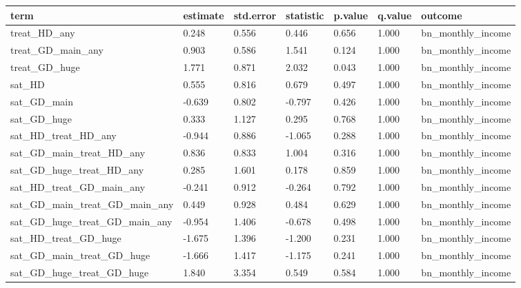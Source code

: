 \begin{tabular}{lllllll}
\toprule
term & estimate & std.error & statistic & p.value & q.value & outcome
 \\
\midrule
treat\_HD\_any & 0.248 & 0.556 & 0.446 & 0.656 & 1.000 & bn\_monthly\_income \\
treat\_GD\_main\_any & 0.903 & 0.586 & 1.541 & 0.124 & 1.000 & bn\_monthly\_income \\
treat\_GD\_huge & 1.771 & 0.871 & 2.032 & 0.043 & 1.000 & bn\_monthly\_income \\
sat\_HD & 0.555 & 0.816 & 0.679 & 0.497 & 1.000 & bn\_monthly\_income \\
sat\_GD\_main & -0.639 & 0.802 & -0.797 & 0.426 & 1.000 & bn\_monthly\_income \\
sat\_GD\_huge & 0.333 & 1.127 & 0.295 & 0.768 & 1.000 & bn\_monthly\_income \\
sat\_HD\_treat\_HD\_any & -0.944 & 0.886 & -1.065 & 0.288 & 1.000 & bn\_monthly\_income \\
sat\_GD\_main\_treat\_HD\_any & 0.836 & 0.833 & 1.004 & 0.316 & 1.000 & bn\_monthly\_income \\
sat\_GD\_huge\_treat\_HD\_any & 0.285 & 1.601 & 0.178 & 0.859 & 1.000 & bn\_monthly\_income \\
sat\_HD\_treat\_GD\_main\_any & -0.241 & 0.912 & -0.264 & 0.792 & 1.000 & bn\_monthly\_income \\
sat\_GD\_main\_treat\_GD\_main\_any & 0.449 & 0.928 & 0.484 & 0.629 & 1.000 & bn\_monthly\_income \\
sat\_GD\_huge\_treat\_GD\_main\_any & -0.954 & 1.406 & -0.678 & 0.498 & 1.000 & bn\_monthly\_income \\
sat\_HD\_treat\_GD\_huge & -1.675 & 1.396 & -1.200 & 0.231 & 1.000 & bn\_monthly\_income \\
sat\_GD\_main\_treat\_GD\_huge & -1.666 & 1.417 & -1.175 & 0.241 & 1.000 & bn\_monthly\_income \\
sat\_GD\_huge\_treat\_GD\_huge & 1.840 & 3.354 & 0.549 & 0.584 & 1.000 & bn\_monthly\_income \\
\bottomrule
\end{tabular}
